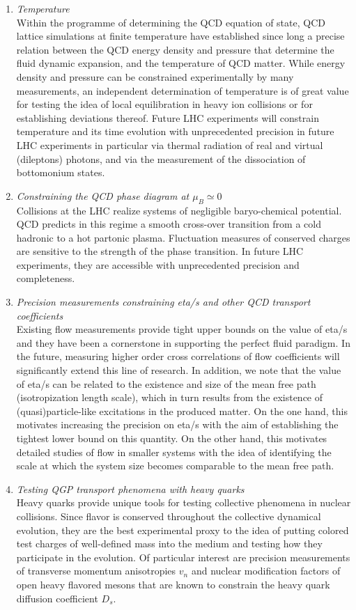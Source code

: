 \documentclass[../report.tex]{subfiles}
\begin{document}
\begin{enumerate}
\item {\it Temperature}\\
Within the programme of determining the QCD equation of state, QCD lattice simulations at finite temperature have established since long a precise relation between the QCD energy density and pressure that determine the fluid dynamic expansion, and the temperature of QCD matter.  While energy density and pressure can be constrained experimentally by many measurements, an independent determination of temperature is of great value for testing the idea of local equilibration in heavy ion collisions or for establishing deviations thereof. Future LHC experiments will constrain  temperature and its time evolution with unprecedented precision in future LHC experiments in particular via thermal radiation of real and virtual (dileptons) photons, and via the measurement of the dissociation of bottomonium states. 
\item {\it Constraining the QCD phase diagram at $\mu_B \simeq 0$}\\ Collisions at the LHC realize systems of negligible baryo-chemical potential. QCD predicts in this regime a smooth cross-over transition from a cold hadronic to a hot partonic plasma. Fluctuation measures of conserved charges are sensitive to the strength of the phase transition. In future LHC experiments, they are accessible with unprecedented precision and completeness. 
\item {\it Precision measurements constraining eta/s and other QCD transport coefficients}\\ Existing flow measurements provide tight upper bounds on the value of eta/s and they have been a cornerstone in supporting the perfect fluid paradigm. In the future, measuring higher order cross correlations of flow coefficients will significantly extend this line of research.  In addition, we note that the value of eta/s can be related to the existence and size of the mean free path (isotropization length scale), which in turn results from the existence of (quasi)particle-like excitations in the produced matter. On the one hand, this motivates increasing the precision on eta/s with the aim of establishing the tightest lower bound on this quantity. On the other hand, this motivates detailed studies of flow in smaller systems with the idea of identifying the scale at which the system size becomes comparable to the mean free path. 
\item {\it Testing QGP transport phenomena with heavy quarks}\\ Heavy quarks provide unique tools for testing collective phenomena in nuclear collisions. Since flavor is conserved throughout the collective dynamical evolution, they are the best experimental proxy to the idea of putting colored test charges of well-defined mass into the medium and testing how they participate in the evolution. Of particular interest are precision measurements of transverse momentum anisotropies $v_n$ and nuclear modification factors of open heavy flavored mesons that are known to constrain the heavy quark diffusion coefficient $D_s$.

\end{enumerate}
\end{document}
